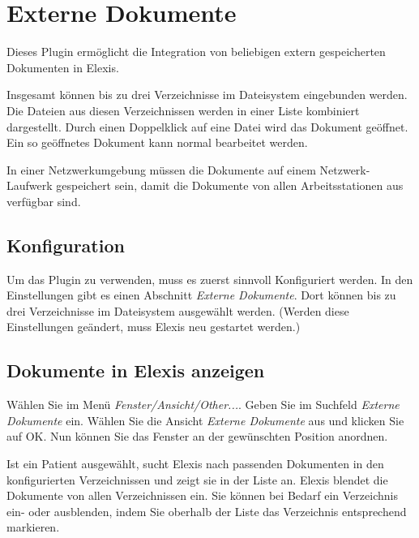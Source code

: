 
\section{Externe Dokumente}\label{elexis-externedokumente}
Dieses Plugin ermöglicht die Integration von beliebigen extern gespeicherten
Dokumenten in Elexis.

Insgesamt können bis zu drei Verzeichnisse im Dateisystem eingebunden werden.
Die Dateien aus diesen Verzeichnissen werden in einer Liste kombiniert dargestellt.
Durch einen Doppelklick auf eine Datei wird das Dokument geöffnet. Ein so geöffnetes
Dokument kann normal bearbeitet werden.

In einer Netzwerkumgebung müssen die Dokumente auf einem Netzwerk-Laufwerk gespeichert
sein, damit die Dokumente von allen Arbeitsstationen aus verfügbar sind.

\subsection{Konfiguration}

Um das Plugin zu verwenden, muss es zuerst sinnvoll Konfiguriert werden.
In den Einstellungen gibt es einen Abschnitt \textit{Externe Dokumente}.
Dort können bis zu drei Verzeichnisse im Dateisystem ausgewählt werden.
(Werden diese Einstellungen geändert, muss Elexis neu gestartet werden.)

\subsection{Dokumente in Elexis anzeigen}

Wählen Sie im Menü \textit{Fenster/Ansicht/Other...}. Geben Sie im Suchfeld
\textit{Externe Dokumente} ein. Wählen Sie die Ansicht \textit{Externe Dokumente} aus
und klicken Sie auf OK. Nun können Sie das Fenster an der gewünschten Position
anordnen.

Ist ein Patient ausgewählt, sucht Elexis nach passenden Dokumenten in den
konfigurierten Verzeichnissen und zeigt sie in der Liste an. Elexis blendet
die Dokumente von allen Verzeichnissen ein. Sie können bei Bedarf ein Verzeichnis
ein- oder ausblenden, indem Sie oberhalb der Liste das Verzeichnis entsprechend
markieren.

